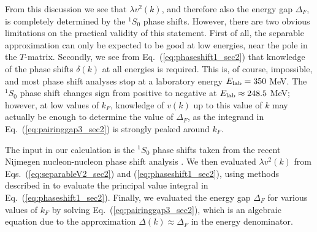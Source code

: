 \documentclass[rmp,aps,floatfix]{revtex4}
\begin{document}
 From this discussion we see that $\lambda v^2(k)$, and therefore also 
the energy gap $\Delta_F$, is completely determined by the $^1S_0$ 
phase shifts.  However, there are two obvious limitations on the 
practical validity of this statement.  First of all, the separable 
approximation can only be expected to be good at low energies, near the 
pole in the $T$-matrix.  Secondly, we see from 
Eq.~(\ref{eq:phaseshift1_sec2}) that 
knowledge of the phase shifts $\delta(k)$ at all energies is required.  
This is, of course, impossible, and most phase shift 
analyses stop at a laboratory energy $E_{\rm lab}=350$ MeV.  The 
$^1S_0$ phase shift changes sign from positive to negative at 
$E_{\rm lab}\approx 248.5$ MeV;
however, at low values of $k_F$, knowledge 
of $v(k)$ up to this value of $k$ may actually be enough to determine 
the value of $\Delta_F$, as the integrand in 
Eq.~(\ref{eq:pairinggap3_sec2}) is 
strongly peaked around $k_F$.  

The input in our calculation is the $^1S_0$ phase shifts taken from  
the recent Nijmegen nucleon-nucleon phase shift analysis \cite{nijpwa}. 
We then evaluated $\lambda v^2(k)$ from Eqs.~(\ref{eq:separableV2_sec2})  
and (\ref{eq:phaseshift1_sec2}), using methods described in 
\cite{bj76} to 
evaluate the principal value integral in Eq.~(\ref{eq:phaseshift1_sec2}). 
Finally, we evaluated the energy gap $\Delta_F$ for various values 
of $k_F$ by solving Eq.~(\ref{eq:pairinggap3_sec2}), which is an algebraic 
equation due to the approximation $\Delta(k)\approx \Delta_F$ in the 
energy denominator.
\end{document}
